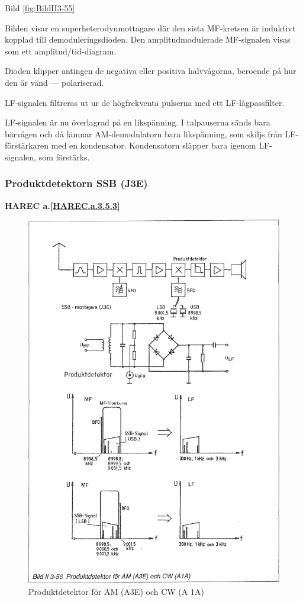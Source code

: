 Bild \ref{fig:BildII3-55}

Bilden visar en superheterodynmottagare där den sista MF-kretsen är
induktivt kopplad till demoduleringsdioden. Den amplitudmodulerade
MF-signalen visas som ett amplitud/tid-diagram.

Dioden klipper antingen de negativa eller positiva halvvågorna,
beroende på hur den är vänd --- polariserad.

LF-signalen filtreras ut ur de högfrekventa pulserna med ett
LF-lågpassfilter.

LF-signalen är nu överlagrad på en likspänning. I talpauserna sänds
bara bärvågen och då lämnar AM-demodulatorn bara likspänning, som
skiljs från LF-förstärkaren med en kondensator. Kondensatorn släpper
bara igenom LF-signalen, som förstärks.

\subsubsection{Produktdetektorn SSB (J3E)}
\textbf{HAREC a.\ref{HAREC.a.3.5.3}\label{myHAREC.a.3.5.3}}

\begin{figure}
\includegraphics[width=\textwidth]{images/bild_2_3-56}
\caption{Produktdetektor för AM (A3E) och CW (A 1A)}
\label{fig:BildII3-56}
\end{figure}

